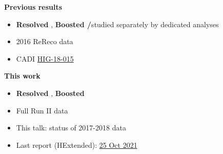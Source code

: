 {  \twoColumns
      {
        \small
        \hspace{1.5cm} \textbf{Previous results}
        \vspace{0.1cm}
        \begin{itemize}
        \item \textcolor{kDarkGreen}{\textbf{Resolved \PQt}},
          \textcolor{kBlue}{\textbf{Boosted \PW/\PQt}}\newline studied separately by dedicated analyses
        \item 2016 ReReco data
        \item CADI \href{https://cms.cern.ch/iCMS/analysisadmin/cadilines?line=HIG-18-015}{\textcolor{kBlue}{HIG-18-015}}
        \end{itemize}
      }
      {
        \small
        \hspace{2cm}  \textbf{This work}
        \vspace{0.1cm}
        \begin{itemize}          
          \item \textcolor{kDarkGreen}{\textbf{Resolved \PQt}}, \textcolor{kBlue}{\textbf{Boosted \PQt}}
          \item Full Run II data
          \item This talk: status of 2017-2018 data
          \item Last report (HExtended):
            \href{https://indico.cern.ch/event/1071752/contributions/4578521/attachments/2333742/3977531/HiggsExtended_MKolosova_25Oct2021.pdf}{\textcolor{kBlue}{25
            Oct 2021}}
        \end{itemize}        
      }
}

